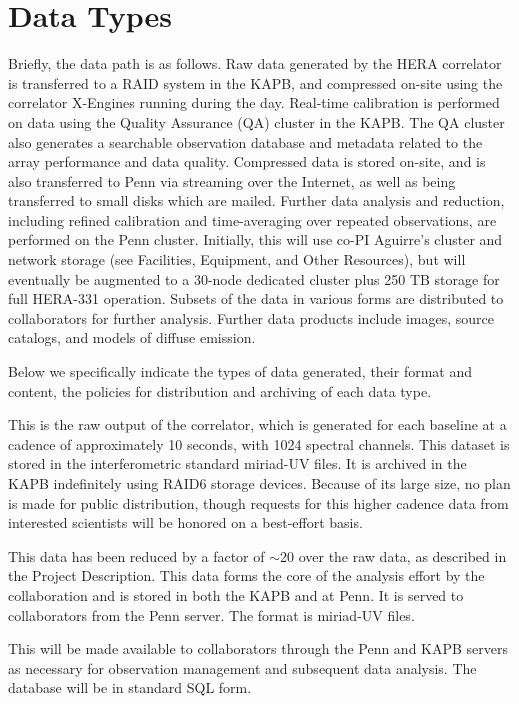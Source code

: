 \documentclass[preprint]{aastex}
\begin{document}
\section{Data Types}

Briefly, the data path is as follows. Raw data generated by the HERA correlator is transferred to a RAID system in the KAPB, and compressed on-site using the correlator X-Engines running during the day.  Real-time calibration is performed on data using the Quality Assurance (QA) cluster in the KAPB.  The QA cluster also generates a searchable observation database and metadata related to the array performance and data quality.
Compressed data is stored on-site, and is also transferred to Penn via streaming over the Internet, as well as being transferred to small disks which are mailed.  Further data analysis and reduction, including refined calibration and time-averaging over repeated observations, are performed on the Penn cluster.  Initially, this will use co-PI Aguirre's cluster and network storage (see Facilities, Equipment, and Other Resources), but will eventually be augmented to a 30-node dedicated cluster plus 250 TB storage for full HERA-331 operation. Subsets of the data in various forms are distributed to collaborators for further analysis.  Further data products include images, source catalogs, and models of diffuse emission.  

Below we specifically indicate the types of data generated, their format and content, the policies for distribution and archiving of each data type.

  This is the raw output of the correlator, which is generated for each baseline at a cadence of approximately 10 seconds, with 1024 spectral channels.  This dataset is stored in the interferometric standard {\sc miriad}-UV files.  It is archived in the KAPB indefinitely using RAID6 storage devices.  Because of its large size, no plan is made for public distribution, though requests for this higher cadence data from interested scientists will be honored on a best-effort basis.
 
  This data has been reduced by a factor of $\sim$20 over the raw data, as described in the Project Description.  This data forms the core of the analysis effort by the collaboration and is stored in both the KAPB and at Penn.  It is served to collaborators from the Penn server.  The format is {\sc miriad}-UV files.
 
  This will be made available to collaborators through the Penn and KAPB servers as necessary for observation management and subsequent data analysis.  The database will be in standard SQL form.
 
\end{document}
